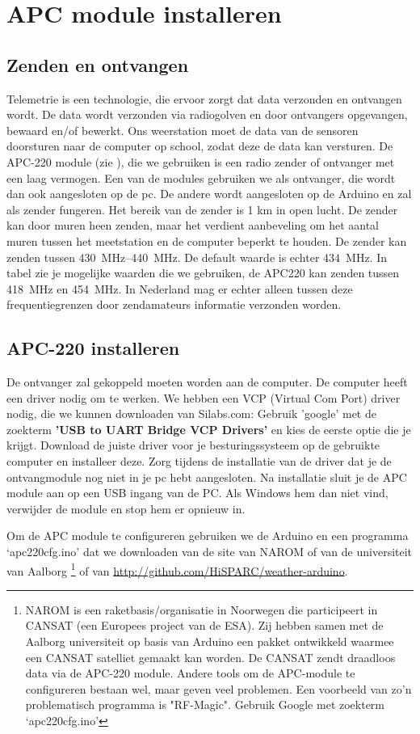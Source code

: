 \section{APC module installeren}

\subsection{Zenden en ontvangen} Telemetrie is een technologie, die
ervoor zorgt dat data verzonden en ontvangen wordt. De data wordt
verzonden via radiogolven en door ontvangers opgevangen, bewaard en/of
bewerkt. Ons weerstation moet de data van de sensoren doorsturen naar de
\hisparc computer op school, zodat deze de data kan versturen. De
APC-220 module (zie ), die we gebruiken is een
radio zender of ontvanger met een laag vermogen. Een van de modules
gebruiken we als ontvanger, die wordt dan ook aangesloten op de pc. De
andere wordt aangesloten op de Arduino en zal als zender fungeren. Het
bereik van de zender is 1 km in open lucht. De zender kan door muren heen
zenden, maar het verdient aanbeveling om het aantal muren tussen het
meetstation en de computer beperkt te houden. De zender kan zenden
tussen \SIrange{430}{440}{\MHz}. De default waarde is echter
\SI{434}{\MHz}. In tabel zie je mogelijke waarden die we gebruiken, de APC220 
kan zenden tussen \SI{418}{\MHz} en \SI{454}{\MHz}.
In Nederland mag er echter alleen tussen deze frequentiegrenzen door
zendamateurs informatie verzonden worden.


\subsection{APC-220 installeren}
De ontvanger zal gekoppeld moeten worden aan de computer. De computer heeft 
een driver nodig om te werken. We hebben een VCP (Virtual Com Port) driver nodig, 
die we kunnen downloaden van Silabs.com:
Gebruik 'google' met de zoekterm \textbf{'USB to UART Bridge VCP Drivers'} en kies de eerste
optie die je krijgt.
Download de juiste driver voor je besturingssysteem op de gebruikte computer
en installeer deze. Zorg tijdens de installatie van de driver dat je de 
ontvangmodule nog niet in je pc hebt aangesloten.
Na installatie sluit je de APC module  aan op een 
USB ingang van de PC. Als Windows hem dan niet vind, verwijder de module en 
stop hem er opnieuw in.

Om de APC module te configureren gebruiken we de Arduino en een
programma `apc220cfg.ino' dat we downloaden van de site van NAROM of van
de universiteit van Aalborg \footnote{NAROM is een
raketbasis/organisatie in Noorwegen die participeert in CANSAT (een
Europees project van de ESA). Zij hebben samen met de Aalborg
universiteit op basis van Arduino een pakket ontwikkeld waarmee een
CANSAT satelliet gemaakt kan worden. De CANSAT zendt draadloos data via
de APC-220 module. Andere tools om de APC-module te configureren bestaan
wel, maar geven veel problemen. Een voorbeeld van zo'n problematisch
programma is "RF-Magic". Gebruik Google met zoekterm `apc220cfg.ino'} of 
van \url{http://github.com/HiSPARC/weather-arduino}.

